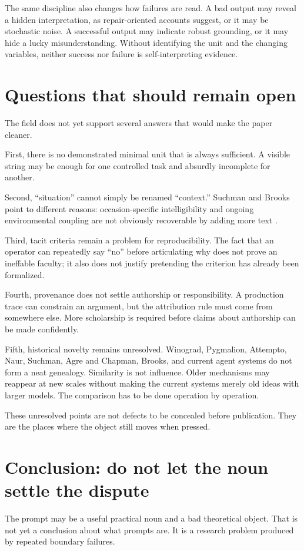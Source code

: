 \documentclass[11pt]{article}
\begin{document}
The same discipline also changes how failures are read. A bad output may reveal a hidden interpretation, as repair-oriented accounts suggest, or it may be stochastic noise. A successful output may indicate robust grounding, or it may hide a lucky misunderstanding. Without identifying the unit and the changing variables, neither success nor failure is self-interpreting evidence.

\section{Questions that should remain open}
The field does not yet support several answers that would make the paper cleaner.

First, there is no demonstrated minimal unit that is always sufficient. A visible string may be enough for one controlled task and absurdly incomplete for another.

Second, “situation” cannot simply be renamed “context.” Suchman and Brooks point to different reasons: occasion-specific intelligibility and ongoing environmental coupling are not obviously recoverable by adding more text \parencite{suchman1985plans,brooks1991intelligence}.

Third, tacit criteria remain a problem for reproducibility. The fact that an operator can repeatedly say “no” before articulating why does not prove an ineffable faculty; it also does not justify pretending the criterion has already been formalized.

Fourth, provenance does not settle authorship or responsibility. A production trace can constrain an argument, but the attribution rule must come from somewhere else. More scholarship is required before claims about authorship can be made confidently.

Fifth, historical novelty remains unresolved. Winograd, Pygmalion, Attempto, Naur, Suchman, Agre and Chapman, Brooks, and current agent systems do not form a neat genealogy. Similarity is not influence. Older mechanisms may reappear at new scales without making the current systems merely old ideas with larger models. The comparison has to be done operation by operation.

These unresolved points are not defects to be concealed before publication. They are the places where the object still moves when pressed.

\section{Conclusion: do not let the noun settle the dispute}
The prompt may be a useful practical noun and a bad theoretical object. That is not yet a conclusion about what prompts are. It is a research problem produced by repeated boundary failures.
\end{document}
